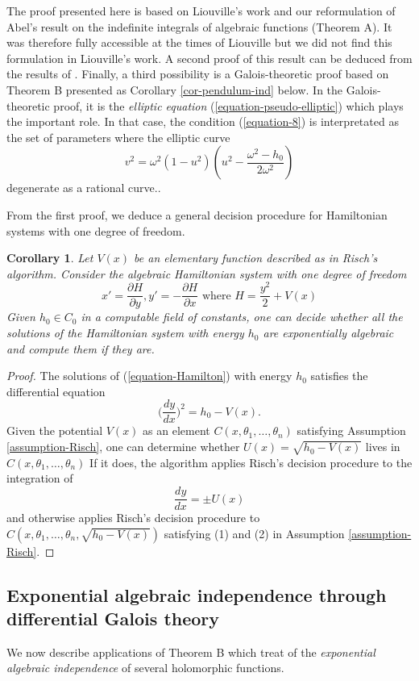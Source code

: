 \documentclass[12pt]{amsart}
\theoremstyle{definition}
\theoremstyle{plain}
\newtheorem{cor}[defn]{Corollary}
\theoremstyle{exampstyle}\newtheorem{thmx}{Theorem}
\theoremstyle{exampstyle}\newtheorem{thmxbis}{Theorem}
\begin{document}
The proof presented here is based on Liouville's work and our reformulation of Abel's result on the indefinite integrals of algebraic functions (Theorem A). It was therefore fully accessible at the times of Liouville but we did not find this formulation in Liouville's work. A second proof of this result can be deduced from the results of \cite{Jones-Kirby-Servi}. Finally, a third possibility is a Galois-theoretic proof based on Theorem B presented as Corollary \ref{cor-pendulum-ind} below.  In the Galois-theoretic proof, it is the {\em elliptic equation} (\ref{equation-pseudo-elliptic}) which plays the important role. In that case, the condition (\ref{equation-8}) is interpretated as the set of parameters where the elliptic curve 
$$ v^2 = \omega^2(1-u^2)(u^2 - \frac{\omega^2-h_0}{2\omega^2}) $$
degenerate as a rational curve..

From the first proof, we deduce a general decision procedure for Hamiltonian systems with one degree of freedom.

\begin{cor} \label{cor-Hamiltonian}
Let $V(x)$ be an elementary function described as in Risch's algorithm. Consider the algebraic Hamiltonian system with one degree of freedom
\begin{equation}\label{equation-Hamilton}
 x' = \frac {\partial H} {\partial y}, y' = - \frac {\partial H} {\partial x} \text { where }  H = \frac {y^{2}}{2}  + V(x) 
 \end{equation}
Given $h_0 \in C_0$ in a computable field of constants, one can decide whether all the solutions of the Hamiltonian system with energy $h_0$ are {\em exponentially algebraic} and compute them if they are.
\end{cor} 

\begin{proof} 
The solutions of (\ref{equation-Hamilton}) with energy $h_0$ satisfies the differential equation 
$$ \Big(\frac{dy}{dx}\Big)^2 = h_0 - V(x).$$
Given the potential $V(x)$ as an element $C(x,\theta_1,\ldots,\theta_n)$ satisfying Assumption \ref{assumption-Risch}, one can determine whether $U(x) = \sqrt{h_0 - V(x)}$ lives in $C(x,\theta_1,\ldots,\theta_n)$ If it does, the algorithm applies Risch's decision procedure to the integration of 
$$ \frac{dy} {dx} = \pm U(x)$$
and otherwise applies Risch's decision procedure to $C(x,\theta_1,\ldots,\theta_n,\sqrt{h_0 - V(x)})$ satisfying (1) and (2) in Assumption \ref{assumption-Risch}.
\end{proof}


\subsection{Exponential algebraic independence through differential Galois theory} \label{section-exponential algebraic independence} We now describe applications of Theorem B which treat of the {\em exponential algebraic independence} of several holomorphic functions. 
\end{document}
